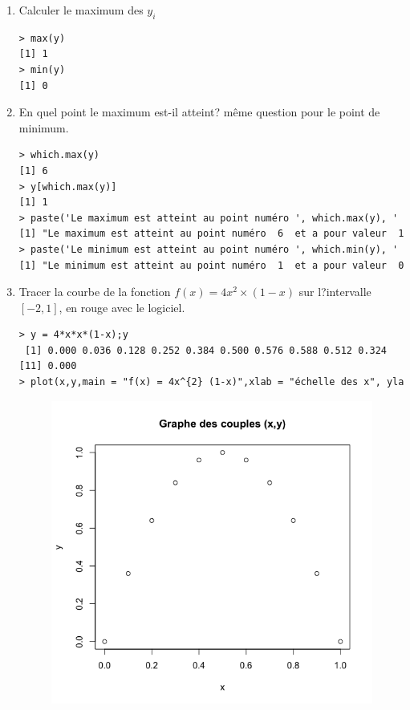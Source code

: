 \begin{enumerate}
\item Calculer le maximum des $y_{i}$
 \begin{lstlisting}[language=html]
> max(y)
[1] 1
> min(y)
[1] 0
\end{lstlisting}
\item En quel point le maximum est-il atteint? même question pour le point de minimum.
\begin{lstlisting}[language=html]
> which.max(y)
[1] 6
> y[which.max(y)]
[1] 1
> paste('Le maximum est atteint au point numéro ', which.max(y), ' et a pour valeur ', y[which.max(y)])
[1] "Le maximum est atteint au point numéro  6  et a pour valeur  1"
> paste('Le minimum est atteint au point numéro ', which.min(y), ' et a pour valeur ', y[which.min(y)])
[1] "Le minimum est atteint au point numéro  1  et a pour valeur  0"
\end{lstlisting}
\item Tracer la courbe de la fonction $f(x) = 4x^{2}\times(1-x)$ sur l?intervalle $[-2, 1]$, en rouge avec  le logiciel.
\begin{lstlisting}[language=html]
> y = 4*x*x*(1-x);y
 [1] 0.000 0.036 0.128 0.252 0.384 0.500 0.576 0.588 0.512 0.324
[11] 0.000
> plot(x,y,main = "f(x) = 4x^{2} (1-x)",xlab = "échelle des x", ylab = "échelle des y",xlim=c(- 2,1),ylim=c(-1,1),col="red")
\end{lstlisting}
\begin{figure}[H]\begin{center}\includegraphics[scale=0.5]{ilu/ExoPlot1.png}\end{center}\end{figure}
\end{enumerate}
